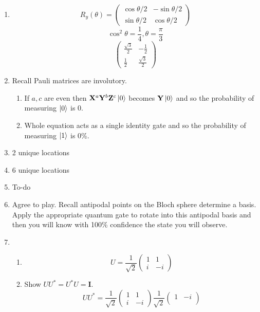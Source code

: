 \documentclass[12pt]{article}
\begin{document}
\begin{enumerate}[font=\bfseries]
    \item \[R_y(\theta) = \begin{pmatrix} \cos{\theta/2} & -\sin{\theta/2} \\
        \sin{\theta/2} & \cos{\theta/2}
        \end{pmatrix}\]
        \[\cos^2{\theta} = \frac{1}{4}, \theta = \frac{\pi}{3}\]
        \[\begin{pmatrix} 
        \frac{\sqrt{3}}{2} & -\frac{1}{2} \\
        \frac{1}{2} & \frac{\sqrt{3}}{2}
            \end{pmatrix}
        \]
    \item Recall Pauli matrices are involutory.
        \begin{enumerate}
            \item If $a,c$ are even then $\mathbf{X}^a\mathbf{Y}^b\mathbf{Z}^c\ket{0}$ becomes $\mathbf{Y}\ket{0}$ and so the probability of measuring $\ket{0}$ is 0. 
            \item Whole equation acts as a single identity gate and so the probability of measuring $\ket{1}$ is 0\%.
        \end{enumerate}
    \item 2 unique locations
    \item 6 unique locations
    \item To-do
    \item Agree to play. Recall antipodal points on the Bloch sphere determine a basis. Apply the appropriate quantum gate to rotate into this antipodal basis and then you will know with 100\% confidence the state you will observe.
    \item 
        \begin{enumerate}
            \item \[U = \frac{1}{\sqrt{2}}\begin{pmatrix}
                        1 & 1 \\
                        i & -i
                        \end{pmatrix}\]
            \item Show $UU^* = U^*U = \mathbf{I}$. 
                \[UU^* = \frac{1}{\sqrt{2}}\begin{pmatrix}
                        1 & 1 \\
                        i & -i
                        \end{pmatrix}
                        \frac{1}{\sqrt{2}}\begin{pmatrix}
                        1 & -i \\

\end{pmatrix}\]
\end{enumerate}
\end{enumerate}
\end{document}
